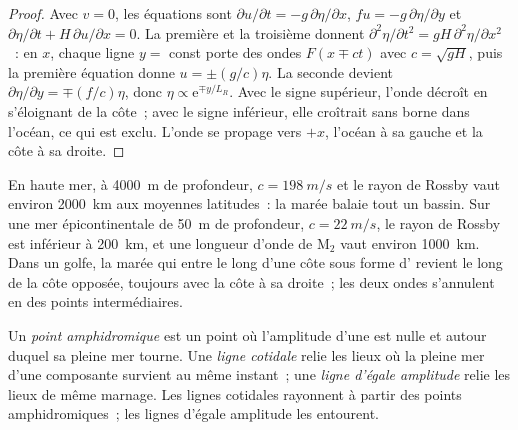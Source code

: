 \begin{proof}
Avec $v = 0$, les équations sont $\partial u/\partial t = -g\,\partial\eta/
\partial x$, $fu = -g\,\partial\eta/\partial y$ et $\partial\eta/\partial t
+ H\,\partial u/\partial x = 0$. La première et la troisième donnent $\partial^2
\eta/\partial t^2 = gH\,\partial^2\eta/\partial x^2$~: en $x$, chaque ligne
$y = $ const porte des ondes $F(x \mp ct)$ avec $c = \sqrt{gH}$, puis la
première équation donne $u = \pm(g/c)\eta$. La seconde devient $\partial\eta/
\partial y = \mp(f/c)\eta$, donc $\eta \propto \mathrm e^{\mp y/L_R}$. Avec
le signe supérieur, l'onde décroît en s'éloignant de la côte~; avec le signe inférieur, elle
croîtrait sans borne dans l'océan, ce qui est exclu. L'onde se propage vers
$+x$, l'océan à sa gauche et la côte à sa droite.
\end{proof}

En haute mer, à \qty{4000}{m} de profondeur, $c = \qty{198}{m/s}$ et le
rayon de Rossby vaut environ \qty{2000}{km} aux moyennes latitudes~: la marée
balaie tout un bassin. Sur une mer épicontinentale de \qty{50}{m} de profondeur, $c =
\qty{22}{m/s}$, le rayon de Rossby est inférieur à \qty{200}{km}, et une
longueur d'onde de M$_2$ vaut environ \qty{1000}{km}. Dans un golfe, la marée qui entre
le long d'une côte sous forme d' revient le long de la côte opposée, toujours avec la
côte à sa droite~; les deux ondes s'annulent en des points intermédiaires.

\begin{definition}\label{def:b3:ocean-dynamics:amphidrome}
Un \emph{point amphidromique} est un point où
l'amplitude d'une  est nulle et autour duquel sa pleine mer
tourne. Une \emph{ligne cotidale} relie les lieux où la
pleine mer d'une composante survient au même instant~; une \emph{ligne
d'égale amplitude} relie les lieux de même marnage. Les lignes cotidales
rayonnent à partir des points amphidromiques~; les lignes d'égale amplitude les entourent.
\end{definition}

